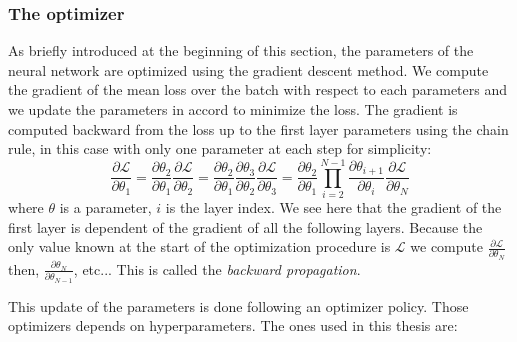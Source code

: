 \documentclass[../main.tex]{subfiles}
\begin{document}
\subsubsection{The optimizer}
\label{sec:ml:optim}

As briefly introduced at the beginning of this section, the parameters of the neural network are optimized using the gradient descent method. We compute the gradient of the mean loss over the batch with respect to each parameters and we update the parameters in accord to minimize the loss. The  gradient is computed backward from the loss up to the first layer parameters using the chain rule, in this case with only one parameter at each step for simplicity:
\begin{equation}
  \label{eq:ml:backward}
  \frac{\partial \mathcal{L}}{\partial \theta_1} = \frac{\partial \theta_2}{\partial \theta_1} \frac{\partial \mathcal{L}}{\partial \theta_2} = \frac{\partial \theta_2}{\partial \theta_1} \frac{\partial \theta_3}{\partial \theta_2} \frac{\partial \mathcal{L}}{\partial \theta_3} = \frac{\partial \theta_2}{\partial \theta_1} \prod_{i=2}^{N-1} \frac{\partial \theta_{i+1}}{\partial \theta_i} \frac{\partial \mathcal{L}}{\partial \theta_N}
\end{equation}
where $\theta$ is a parameter, $i$ is the layer index. We see here that the gradient of the first layer is dependent of the gradient of all the following layers. Because the only value known at the start of the optimization procedure is $\mathcal{L}$ we compute $\frac{\partial \mathcal{L}}{\partial \theta_N}$ then, $\frac{\partial \theta_{N}}{\partial \theta_{N-1}}$, etc... This is called the \textit{backward propagation}.

This update of the parameters is done following an optimizer policy. Those optimizers depends on hyperparameters. The ones used in this thesis are:
\end{document}
